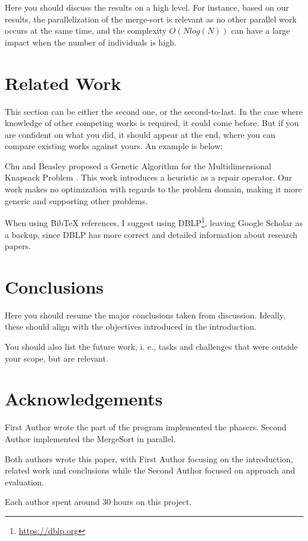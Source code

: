 \documentclass[runningheads]{llncs}
\begin{document}
Here you should discuss the results on a high level. For instance, based on our results, the parallelization of the merge-sort is relevant as no other parallel work occurs at the same time, and the complexity $O(N log(N))$ can have a large impact when the number of individuals is high.

\section{Related Work}

This section can be either the second one, or the second-to-last. In the case where knowledge of other competing works is required, it could come before. But if you are confident on what you did, it should appear at the end, where you can compare existing works against yours. An example is below:

Chu and Beasley proposed a Genetic Algorithm for the Multidimensional Knapsack Problem \cite{DBLP:journals/heuristics/ChuB98}. This work introduces a heuristic as a repair operator. Our work makes no optimization with regards to the problem domain, making it more generic and supporting other problems.


When using BibTeX references, I suggest using DBLP\footnote{\url{https://dblp.org}}, leaving Google Scholar as a backup, since DBLP has more correct and detailed information about research papers.

\section{Conclusions}

Here you should resume the major conclusions taken from discussion. Ideally, these should align with the objectives introduced in the introduction.


You should also list the future work, i. e., tasks and challenges that were outside your scope, but are relevant.

\section*{Acknowledgements}

First Author wrote the part of the program implemented the phasers. Second Author implemented the MergeSort in parallel. 

Both authors wrote this paper, with First Author focusing on the introduction, related work and conclusions while the Second Author focused on approach and evaluation.

Each author spent around 30 hours on this project.



\end{document}
